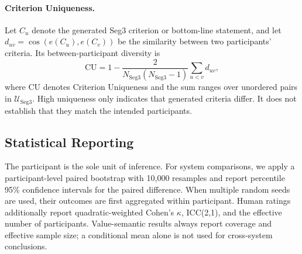 \paragraph{Criterion Uniqueness.}
Let $C_u$ denote the generated Seg3 criterion or bottom-line statement, and let $d_{uv}=\cos(e(C_u),e(C_v))$ be the similarity between two participants' criteria. Its between-participant diversity is
\begin{equation}
\mathrm{CU}
=1-\frac{2}{N_{\mathrm{Seg3}}(N_{\mathrm{Seg3}}-1)}
\sum_{u<v}d_{uv},
\label{eq:criterion_uniqueness}
\end{equation}
where $\mathrm{CU}$ denotes Criterion Uniqueness and the sum ranges over unordered pairs in $\mathcal U_{\mathrm{Seg3}}$.
High uniqueness only indicates that generated criteria differ. It does not establish that they match the intended participants.

\subsection{Statistical Reporting}

The participant is the sole unit of inference. For system comparisons, we apply a participant-level paired bootstrap with 10,000 resamples and report percentile 95\% confidence intervals for the paired difference. When multiple random seeds are used, their outcomes are first aggregated within participant. Human ratings additionally report quadratic-weighted Cohen's $\kappa$, ICC(2,1), and the effective number of participants. Value-semantic results always report coverage and effective sample size; a conditional mean alone is not used for cross-system conclusions.
